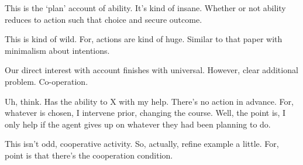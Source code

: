 \begin{note}
  This is the `plan' account of ability.
  It's kind of insane.
  Whether or not ability reduces to action such that choice and secure outcome.
\end{note}

\begin{note}
  This is kind of wild.
  For, actions are kind of huge.
  Similar to that paper with minimalism about intentions.
\end{note}

\begin{note}
  Our direct interest with account finishes with universal.
  However, clear additional problem.
  Co-operation.
\end{note}

\begin{note}
  Uh, think.
  Has the ability to X with my help.
  There's no action in advance.
  For, whatever is chosen, I intervene prior, changing the course.
  Well, the point is, I only help if the agent gives up on whatever they had been planning to do.

  This isn't odd, cooperative activity.
  So, actually, refine example a little.
  For, point is that there's the cooperation condition.
\end{note}




